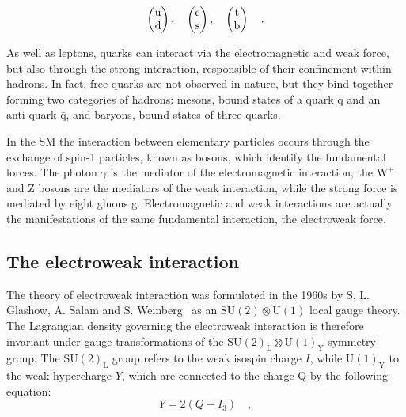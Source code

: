 \begin{equation}
\label{eq:quarks}
\begin{pmatrix} \rm u       \\ \rm d      \end{pmatrix}, \quad
\begin{pmatrix} \rm c       \\ \rm s      \end{pmatrix}, \quad
\begin{pmatrix} \rm t       \\ \rm b      \end{pmatrix}  \quad .
\end{equation}

As well as leptons, quarks can interact via the electromagnetic and weak force, but also through the strong interaction, responsible of their confinement within hadrons. In fact, free quarks are not observed in nature, but they bind together forming two categories of hadrons: mesons, bound states of a quark q and an anti-quark $\mathrm{\bar{q}}$, and baryons, bound states of three quarks.

In the SM the interaction between elementary particles occurs through the exchange of spin-1 particles, known as bosons, which identify the fundamental forces. The photon $\gamma$ is the mediator of the electromagnetic interaction, the $\mathrm{W^{\pm}}$ and Z bosons are the mediators of the weak interaction, while the strong force is mediated by eight gluons g. Electromagnetic and weak interactions are actually the manifestations of the same fundamental interaction, the electroweak force.


\subsection{The electroweak interaction}

The theory of electroweak interaction was formulated in the 1960s by S. L. Glashow, A. Salam and S. Weinberg~\cite{Glashow:1961tr,Weinberg:1967tq} as an $\mathrm{SU(2) \otimes U(1)}$ local gauge theory.
The Lagrangian density governing the electroweak interaction is therefore invariant under gauge transformations of the $\mathrm{SU(2)_L\otimes U(1)_Y}$ symmetry group. The $\mathrm{SU(2)_L}$ group refers to the weak isospin charge $I$, while $\mathrm{U(1)_Y}$ to the weak hypercharge $Y$, which are connected to the charge Q by the following equation:
\begin{equation}
Y = 2(Q - I_3) \quad,
\end{equation}

